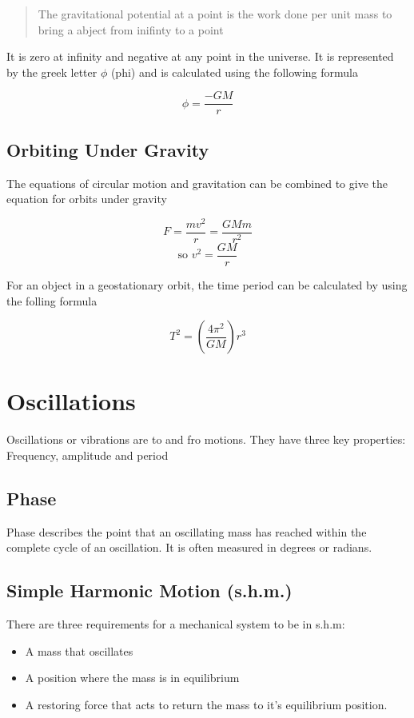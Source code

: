 \documentclass{scrbook}
\begin{document}
	\begin{quote}
		The gravitational potential at a point is the work done per unit mass to bring a abject from inifinty to a point
	\end{quote}

	It is zero at infinity and negative at any point in the universe. It is represented by the greek letter $\phi$ (phi) and is calculated using the following formula

	\[ \phi = \frac{-GM}{r} \]

\subsection{Orbiting Under Gravity}

	The equations of circular motion and gravitation can be combined to give the equation for orbits under gravity

	\[ F = \frac{mv^2}{r} = \frac{GMm}{r^2}\]
	\[ \text{so } v^2 = \frac{GM}{r}\]

	For an object in a geostationary orbit, the time period can be calculated by using the folling formula

	\[ T^2 = \left(\frac{4\pi^2}{GM}\right)r^3 \]

\section{Oscillations}

	Oscillations or vibrations are to and fro motions. They have three key properties: Frequency, amplitude and period

\subsection{Phase}

	Phase describes the point that an oscillating mass has reached within the complete cycle of an oscillation. It is often measured in degrees or radians. 

\subsection{Simple Harmonic Motion (s.h.m.)}

	There are three requirements for a mechanical system to be in s.h.m:

	\begin{itemize}
		\item
			A mass that oscillates
		\item
			A position where the mass is in equilibrium 
		\item
			A restoring force that acts to return the mass to it's equilibrium position.
	\end{itemize}
\end{document}
